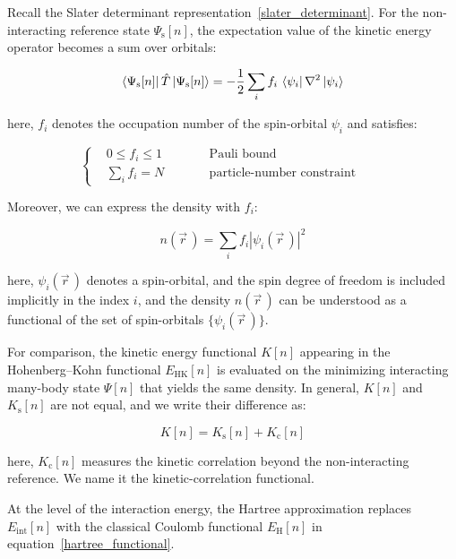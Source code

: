 Recall the Slater determinant representation~\eqref{slater_determinant}.
For the non-interacting reference state $\Psi_\mathrm{s}[n]$,
the expectation value of the kinetic energy operator becomes a sum over orbitals:

\begin{equation}
    \bra{\Psi_\mathrm{s}[n]}\hat{T}\ket{\Psi_\mathrm{s}[n]}
    = -\frac{1}{2}\sum_i f_i\,\bra{\psi_i}\nabla^2\ket{\psi_i} 
\label{Ts_orbital_sum}
\end{equation}

here, $f_i$ denotes the occupation number of the spin-orbital $\psi_i$ and satisfies:

\begin{equation}
\left\{
\begin{aligned}
    &0\le f_i\le 1              &&\qquad  \text{Pauli bound} \\
    &\textstyle{\sum_i}f_i = N  &&\qquad  \text{particle-number constraint}
\end{aligned}
\right.
\qquad
\label{occupation_constraints}
\end{equation}

Moreover, we can express the density with $f_i$:

\begin{equation}
    n(\vec{r}\,)=\sum_i f_i |\psi_i(\vec{r}\,)|^2
\label{density_with_occupation_number}
\end{equation}

here, $\psi_i(\vec{r}\,)$ denotes a spin-orbital, and the spin degree of freedom is included implicitly in the index $i$,
and the density $n(\vec{r}\,)$ can be understood as a functional of the set of spin-orbitals $\{\psi_i(\vec{r}\,)\}$.

For comparison, the kinetic energy functional $K[n]$ appearing in the Hohenberg--Kohn functional $E_\mathrm{HK}[n]$ is evaluated on the minimizing interacting many-body state $\Psi[n]$ that yields the same density.
In general, $K[n]$ and $K_\mathrm{s}[n]$ are not equal, and we write their difference as:

\begin{equation}
    K[n]=K_\mathrm{s}[n]+K_\mathrm{c}[n]
\label{T_decomposition}
\end{equation}

here, $K_\mathrm{c}[n]$ measures the kinetic correlation beyond the non-interacting reference.
We name it the kinetic-correlation functional.

At the level of the interaction energy, the Hartree approximation replaces $E_\mathrm{int}[n]$ with the classical Coulomb functional $E_\mathrm{H}[n]$ in equation~\eqref{hartree_functional}.

